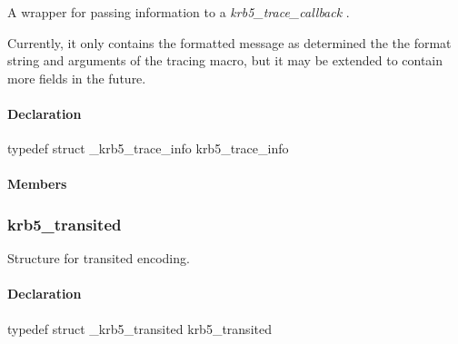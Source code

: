 \documentclass[letterpaper,10pt,english]{sphinxmanual}
\begin{document}
\begin{fulllineitems}
\label{appdev/refs/types/krb5_trace_info:c.krb5_trace_info}
\end{fulllineitems}


A wrapper for passing information to a \emph{krb5\_trace\_callback} .

Currently, it only contains the formatted message as determined the the format string and arguments of the tracing macro, but it may be extended to contain more fields in the future.


\paragraph{Declaration}
\label{appdev/refs/types/krb5_trace_info:declaration}
typedef struct \_krb5\_trace\_info  krb5\_trace\_info


\paragraph{Members}
\label{appdev/refs/types/krb5_trace_info:members}

\begin{fulllineitems}
\label{appdev/refs/types/krb5_trace_info:c.krb5_trace_info.message}
\end{fulllineitems}



\subsubsection{krb5\_transited}
\label{appdev/refs/types/krb5_transited:krb5-transited-struct}\label{appdev/refs/types/krb5_transited::doc}\label{appdev/refs/types/krb5_transited:krb5-transited}

\begin{fulllineitems}
\label{appdev/refs/types/krb5_transited:c.krb5_transited}
\end{fulllineitems}


Structure for transited encoding.


\paragraph{Declaration}
\label{appdev/refs/types/krb5_transited:declaration}
typedef struct \_krb5\_transited  krb5\_transited
\end{document}
